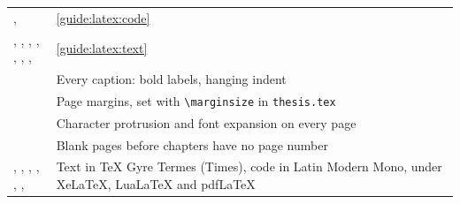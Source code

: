 \begin{xltabular}{\linewidth}{>{\ttfamily\raggedright\arraybackslash{}\hsize}X >{\raggedright\arraybackslash{}\hsize}X}
  ,  & \cref{guide:latex:code} \\
  , , , , , , ,  & \cref{guide:latex:text} \\
   & Every caption: bold labels, hanging indent \\
   & Page margins, set with \texttt{\textbackslash marginsize} in \texttt{thesis.tex} \\
   & Character protrusion and font expansion on every page \\
   & Blank pages before chapters have no page number \\
  , , , , , ,  & Text in TeX Gyre Termes (Times), code in Latin Modern Mono, under XeLaTeX, LuaLaTeX and pdfLaTeX \\
  \bottomrule
\end{xltabular}
